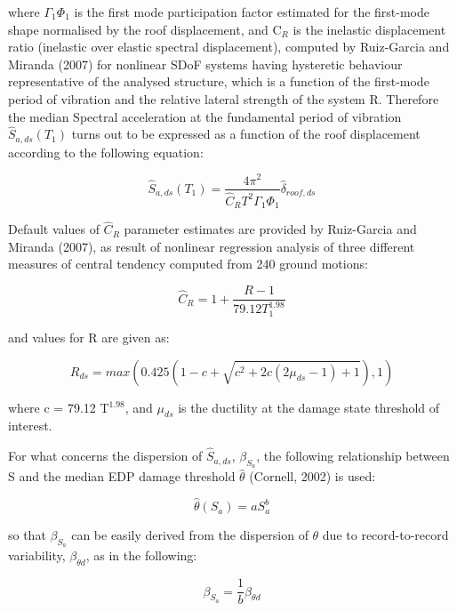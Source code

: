 where $\Gamma_1 \Phi_1$ is the first mode participation factor estimated for the first-mode shape normalised by the roof displacement, and C$_R$ is the inelastic displacement ratio (inelastic over elastic spectral displacement), computed by Ruiz-Garcia and Miranda (2007) for nonlinear SDoF systems having hysteretic behaviour representative of the analysed structure, which is a function of the first-mode period of vibration and the relative lateral strength of the system R. Therefore the median Spectral acceleration at the fundamental period of vibration $\hat{S}_{a,ds}(T_1)$ turns out to be expressed as a function of the roof displacement according to the following equation:

\begin{equation}
\hat{S}_{a,ds}(T_1) = \frac{4 \pi^2}{\hat{C}_R T^2 \Gamma_1 \Phi_1} \hat{\delta}_{roof, ds}
\label{eq:Sa_RGM}
\end{equation}

Default values of $\hat{C}_R$ parameter estimates are provided by Ruiz-Garcia and Miranda (2007), as result of nonlinear regression analysis of three different measures of central tendency computed from 240 ground motions:

\begin{equation}
\hat{C}_R = 1 + \frac{R - 1}{79.12 T_1 ^{1.98}}
\label{eq:Cr_RGM}
\end{equation}

and values for R are given as:

\begin{equation}
R_{ds} = max(0.425(1 - c + \sqrt{c^2 + 2c(2 \mu_{ds} - 1) + 1}),1)
\label{eq:R_RGM}
\end{equation}

where c = 79.12 T$^{1.98}$, and $\mu_{ds}$ is the ductility at the damage state threshold of interest.

For what concerns the dispersion of $\hat{S}_{a,ds}$, $\beta_{S_a}$, the following relationship between S and the median EDP damage threshold $\hat{\theta}$ (Cornell, 2002) is used:

\begin{equation}
\hat{\theta}(S_a) = a S_a^b
\end{equation}

so that $\beta_{S_a}$ can be easily derived from the dispersion of $\theta$ due to record-to-record variability, $\beta_{\theta d}$, as in the following:

\begin{equation}
\beta_{S_a} = \frac{1}{b} \beta_{\theta d}
\label{eq:betaSa_RGM}
\end{equation}

